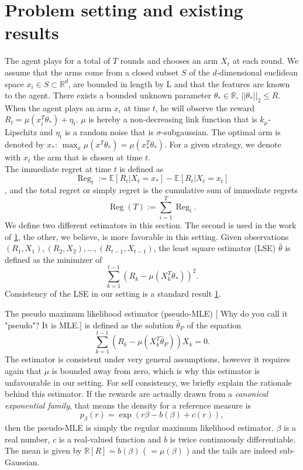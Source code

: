 \documentclass[twoside]{article} \usepackage{aistats2017}
\newcommand{\Reg} {
  \operatorname{Reg}}
\newcommand{\shuai}[1]{{\color{blue!50!black} [\text{Shuai:} #1]}}
\begin{document}
\section{Problem setting and existing results}
The agent plays for a total of $T$ rounds and chooses an arm $X_t$ at each round. 
We assume that the arms come from a closed subset $S$ of the $d$-dimensional euclidean space $x_i \in S\subset\mathbb{R}^d$, are bounded in length by L and that the features are known to the agent.
There exists a bounded unknown parameter $\theta_*\in \mathbb{R}$, $||\theta_*||_2 \leq R$.
When the agent plays an arm $x_i$ at time $t$, he will observe the reward $R_t = \mu(x_i^T\theta_*) +\eta_t$. $\mu$ is hereby a non-decreasing link function that is $k_\mu$-Lipschitz and $\eta_t$ is a random noise that is $\sigma$-subgaussian. The optimal arm is denoted by $x_*$: $\max_x\mu(x^T\theta_*) = \mu(x_*^T\theta_*)$. For a given strategy, we denote with $x_t$ the arm that is chosen at time $t$.\\
The immediate regret at time $t$ is defined as 
$$\Reg_t := \mathbb{E}\left[R_t|X_t=x_*\right]-\mathbb{E}\left[R_t|X_t=x_t\right]$$,
and the total regret or simply regret is the cumulative sum of immediate regrets
$$\Reg(T) := \sum_{i=1}^T \Reg_i.$$
We define two different estimators in this section.
The second is used in the work of \ref{}, the other, we believe, is more favorable in this setting.
Given observations $(R_1,X_1), (R_2,X_2),\ldots,(R_{t-1},X_{t-1})$, the least square estimator (LSE) $\hat{\theta}$ is defined as the minimizer of
$$\sum_{k=1}^{t-1}\left(R_k - \mu(X_k^T\theta_*)\right)^2.$$
Consistency of the LSE in our setting is a standard result \ref{}.

The pseudo maximum likelihood estimator (pseudo-MLE) \shuai{Why do you call it "pseudo"? It is MLE.} is defined as the solution $\hat{\theta}_P$ of the equation
$$\sum_{k=1}^{t-1}(R_k-\mu(X_k^T\hat{\theta}_P))X_k = 0.$$
The estimator is consistent under very general assumptions, however it requires again that $\dot{\mu}$ is bounded away from zero, which is why this estimator is unfavourable in our setting.
For self consistency, we briefly explain the rationale behind this estimator.
If the rewards are actually drawn from a \textit{canonical exponential family}, that means the density for a reference measure is
$$p_\beta(r) = \exp(r\beta − b(\beta) + c(r)) ,$$
then the pseudo-MLE is simply the regular maximum likelihood estimator. $\beta$ is a real number, $c$ is a real-valued function and $b$ is twice continuously differentiable. The mean is given by $\mathbb{R}[R] = \dot{b}(\beta)$ ( $=\mu(\beta)$ ) and the tails are indeed sub-Gaussian. 
\end{document}

